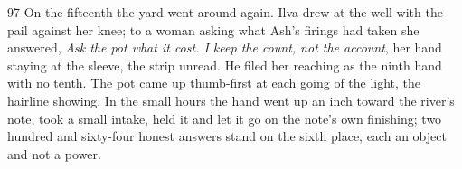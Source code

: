 \begin{CRchronicle}{97}
On the fifteenth the yard went around again. Ilva drew at the well with the pail against her knee; to a woman asking what Ash’s firings had taken she answered, \emph{Ask the pot what it cost. I keep the count, not the account}, her hand staying at the sleeve, the strip unread. He filed her reaching as the ninth hand with no tenth. The pot came up thumb-first at each going of the light, the hairline showing. In the small hours the hand went up an inch toward the river’s note, took a small intake, held it and let it go on the note’s own finishing; two hundred and sixty-four honest answers stand on the sixth place, each an object and not a power.
\end{CRchronicle}
